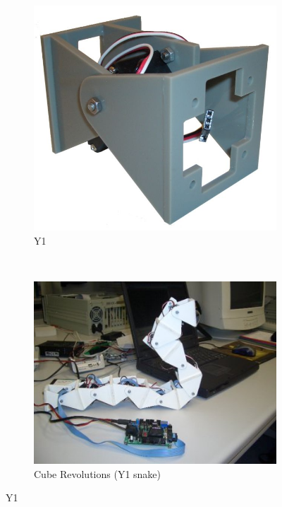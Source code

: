 \begin{figure}[b]
		\centering
        \begin{subfigure}[b]{0.3\textwidth}
                \centering
                \includegraphics[width=\textwidth]{images/Y1_01.jpg}
                \caption{Y1}
                \label{fig:state_art_y1_mod}
        \end{subfigure}
        ~
        \begin{subfigure}[b]{0.3\textwidth}
                \centering
                \includegraphics[width=\textwidth]{images/State_art_Y1_cube.jpeg}
                \caption{Cube Revolutions (Y1 snake)}
                \label{fig:state_art_y1_cube}
        \end{subfigure}
        \caption{Y1} \label{fig:state_art_y1}
\end{figure}

